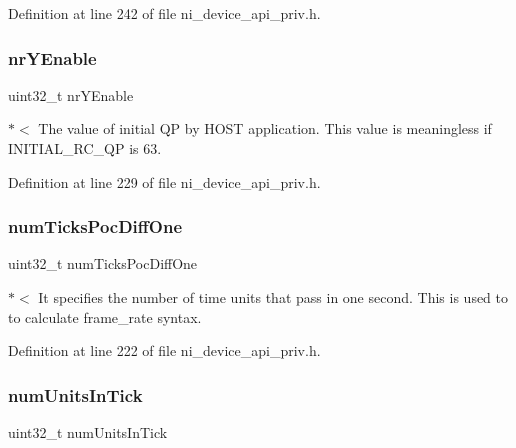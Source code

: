 Definition at line 242 of file ni\+\_\+device\+\_\+api\+\_\+priv.\+h.

\mbox{\label{struct__ni__t408__config__t_a98953814185368ffca54fd85f3b37c85}} 
\subsubsection{\texorpdfstring{nrYEnable}{nrYEnable}}
{\footnotesize\ttfamily uint32\+\_\+t nr\+Y\+Enable}

$\ast$$<$ The value of initial QP by H\+O\+ST application. This value is meaningless if I\+N\+I\+T\+I\+A\+L\+\_\+\+R\+C\+\_\+\+QP is 63. 

Definition at line 229 of file ni\+\_\+device\+\_\+api\+\_\+priv.\+h.

\mbox{\label{struct__ni__t408__config__t_a8c4d2f78ba851272fdf16c530678e8e5}} 
\subsubsection{\texorpdfstring{numTicksPocDiffOne}{numTicksPocDiffOne}}
{\footnotesize\ttfamily uint32\+\_\+t num\+Ticks\+Poc\+Diff\+One}

$\ast$$<$ It specifies the number of time units that pass in one second. This is used to to calculate frame\+\_\+rate syntax. 

Definition at line 222 of file ni\+\_\+device\+\_\+api\+\_\+priv.\+h.

\mbox{\label{struct__ni__t408__config__t_aca700eee67b3ca184301cdc6816f42f0}} 
\subsubsection{\texorpdfstring{numUnitsInTick}{numUnitsInTick}}
{\footnotesize\ttfamily uint32\+\_\+t num\+Units\+In\+Tick}

